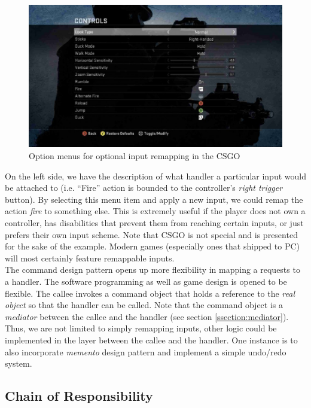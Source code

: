 \begin{multicols}{2}
\begin{figure}[H]
	\centering
	\includegraphics[width=\fullwidth]{assets/csgo-inputs}
	\caption{Option menus for optional input remapping in the CSGO}
	\label{fig:csgo-input}
\end{figure}

On the left side, we have the description of what handler a particular input would be attached to (i.e. ``Fire'' action is bounded to the controller's \textit{right trigger} button). By selecting this menu item and apply a new input, we could remap the action \textit{fire} to something else. This is extremely useful if the player does not own a controller, has disabilities that prevent them from reaching certain inputs, or just prefers their own input scheme. Note that CSGO is not special and is presented for the sake of the example. Modern games (especially ones that shipped to PC) will most certainly feature remappable inputs.\bs
\\
The command design pattern opens up more flexibility in mapping a requests to a handler. The software programming as well as game design is opened to be flexible. The callee invokes a command object that holds a reference to the \textit{real object} so that the handler can be called. Note that the command object is a \textit{mediator} between the callee and the handler (see section \ref{ssection:mediator}). Thus, we are not limited to simply remapping inputs, other logic could be implemented in the layer between the callee and the handler. One instance is to also incorporate \textit{memento} design pattern and implement a simple undo/redo system.\bs
\\

\subsection{Chain of Responsibility}


\end{multicols}
